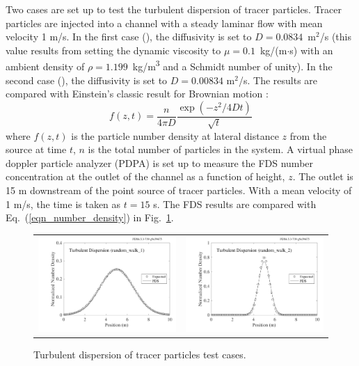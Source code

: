\documentclass[11pt]{book}
\begin{document}
Two cases are set up to test the turbulent dispersion of tracer particles.  Tracer particles are injected into a channel with a steady laminar flow with mean velocity 1 m/s.  In the first case (), the diffusivity is set to $D=0.0834$~m$^2$/s (this value results from setting the dynamic viscosity to $\mu = 0.1$~kg/(m$\cdot$s) with an ambient density of $\rho=1.199$~\si{kg/m^3} and a Schmidt number of unity).  In the second case (), the diffusivity is set to $D=0.00834$ m$^2$/s.  The results are compared with Einstein's classic result for Brownian motion \cite{Gardiner:2004}:
\begin{equation}
\label{eqn_number_density}
f(z,t) = \frac{n}{4\pi D} \frac{\exp \left( -z^2/4Dt \right)}{\sqrt{t}}
\end{equation}
where $f(z,t)$ is the particle number density at lateral distance $z$ from the source at time $t$, $n$ is the total number of particles in the system.  A virtual phase doppler particle analyzer (PDPA) is set up to measure the FDS number concentration at the outlet of the channel as a function of height, $z$.  The outlet is 15 m downstream of the point source of tracer particles.  With a mean velocity of 1 m/s, the time is taken as $t = 15$ s.  The FDS results are compared with Eq.~(\ref{eqn_number_density}) in Fig.~\ref{random_walk_fig}.

\begin{figure}[ht]
\begin{tabular*}{\textwidth}{lr}
\includegraphics[width=3.2in]{SCRIPT_FIGURES/random_walk_1} &
\includegraphics[width=3.2in]{SCRIPT_FIGURES/random_walk_2}
\end{tabular*}
\caption[Turbulent dispersion of tracer particles]{Turbulent dispersion of tracer particles  test cases.}
\label{random_walk_fig}
\end{figure}
\end{document}

